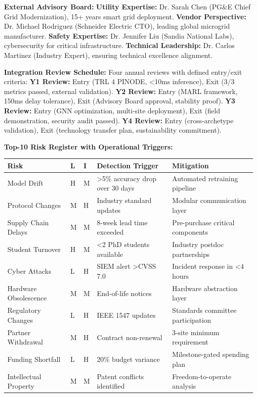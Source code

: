 \documentclass[12pt]{article}
\begin{document}
\textbf{External Advisory Board:} \textbf{Utility Expertise:} Dr. Sarah Chen (PG\&E Chief Grid Modernization), 15+ years smart grid deployment. \textbf{Vendor Perspective:} Dr. Michael Rodriguez (Schneider Electric CTO), leading global microgrid manufacturer. \textbf{Safety Expertise:} Dr. Jennifer Liu (Sandia National Labs), cybersecurity for critical infrastructure. \textbf{Technical Leadership:} Dr. Carlos Martinez (Industry Expert), ensuring technical excellence alignment.

\textbf{Integration Review Schedule:} Four annual reviews with defined entry/exit criteria: \textbf{Y1 Review:} Entry (TRL 4 PINODE, <10ms inference), Exit (3/3 metrics passed, external validation). \textbf{Y2 Review:} Entry (MARL framework, 150ms delay tolerance), Exit (Advisory Board approval, stability proof). \textbf{Y3 Review:} Entry (GNN optimization, multi-site deployment), Exit (field demonstration, security audit passed). \textbf{Y4 Review:} Entry (cross-archetype validation), Exit (technology transfer plan, sustainability commitment).

\textbf{Top-10 Risk Register with Operational Triggers:}

\begin{center}
\footnotesize
\begin{tabular}{|p{2cm}|p{0.8cm}|p{0.8cm}|p{2.5cm}|p{2.5cm}|}
\hline
\textbf{Risk} & \textbf{L} & \textbf{I} & \textbf{Detection Trigger} & \textbf{Mitigation} \\
\hline
Model Drift & H & M & >5\% accuracy drop over 30 days & Automated retraining pipeline \\
Protocol Changes & M & H & Industry standard updates & Modular communication layer \\
Supply Chain Delays & M & M & 8-week lead time exceeded & Pre-purchase critical components \\
Student Turnover & H & M & <2 PhD students available & Industry postdoc partnerships \\
Cyber Attacks & L & H & SIEM alert >CVSS 7.0 & Incident response in <4 hours \\
Hardware Obsolescence & M & M & End-of-life notices & Hardware abstraction layer \\
Regulatory Changes & L & H & IEEE 1547 updates & Standards committee participation \\
Partner Withdrawal & M & H & Contract non-renewal & 3-site minimum requirement \\
Funding Shortfall & L & H & 20\% budget variance & Milestone-gated spending plan \\
Intellectual Property & M & M & Patent conflicts identified & Freedom-to-operate analysis \\
\hline
\end{tabular}
\end{center}
\end{document}

